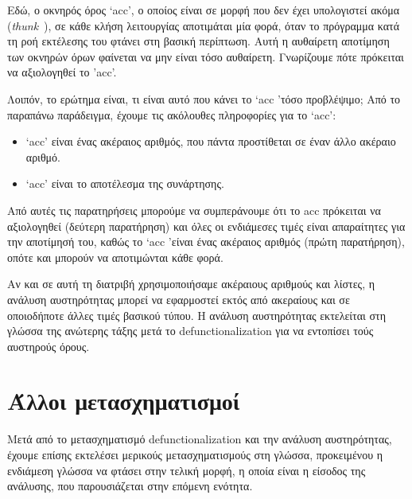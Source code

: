\documentclass[diploma]{softlab-thesis}
\begin{document}
Εδώ, ο οκνηρός όρος `acc', ο οποίος είναι σε μορφή που δεν έχει
υπολογιστεί ακόμα (\emph{thunk}~\cite{Bloss1988}), σε κάθε κλήση
λειτουργίας αποτιμάται μία φορά, όταν το πρόγραμμα κατά τη ροή
εκτέλεσης του φτάνει στη βασική περίπτωση. Αυτή η αυθαίρετη αποτίμηση
των οκνηρών όρων φαίνεται να μην είναι τόσο αυθαίρετη. Γνωρίζουμε πότε
πρόκειται να αξιολογηθεί το 'acc'.

Λοιπόν, το ερώτημα είναι, τι είναι αυτό που κάνει το `acc 'τόσο προβλέψιμο;
Από το παραπάνω παράδειγμα, έχουμε τις ακόλουθες πληροφορίες για το `acc':
\begin{itemize}
  \item `acc' είναι ένας ακέραιος αριθμός, που πάντα προστίθεται σε έναν άλλο ακέραιο αριθμό.
  \item `acc' είναι το αποτέλεσμα της συνάρτησης.
\end{itemize}

Από αυτές τις παρατηρήσεις μπορούμε να συμπεράνουμε ότι το acc πρόκειται να αξιολογηθεί 
(δεύτερη παρατήρηση) και όλες οι ενδιάμεσες τιμές είναι απαραίτητες για την αποτίμησή του, καθώς 
το `acc 'είναι ένας ακέραιος αριθμός (πρώτη παρατήρηση), οπότε και μπορούν να αποτιμώνται κάθε φορά.

Αν και σε αυτή τη διατριβή χρησιμοποιήσαμε ακέραιους αριθμούς και λίστες, η ανάλυση αυστηρότητας 
μπορεί να εφαρμοστεί εκτός από ακεραίους και σε οποιοδήποτε άλλες τιμές βασικού τύπου.
Η ανάλυση αυστηρότητας εκτελείται στη γλώσσα της ανώτερης τάξης μετά το defunctionalization για να 
εντοπίσει τούς αυστηρούς όρους.

\section{Άλλοι μετασχηματισμοί}

Μετά από το μετασχηματισμό defunctionalization και την ανάλυση αυστηρότητας, έχουμε επίσης
εκτελέσει μερικούς μετασχηματισμούς στη γλώσσα, προκειμένου η ενδιάμεση
γλώσσα να φτάσει στην τελική μορφή, η οποία είναι η είσοδος της ανάλυσης, που 
παρουσιάζεται στην επόμενη ενότητα.
\end{document}
